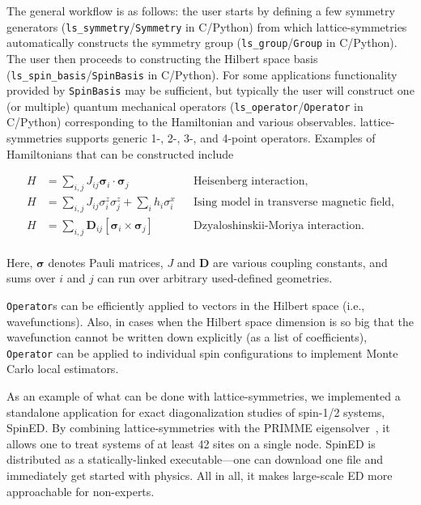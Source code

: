 The general workflow is as follows: the user starts by defining a few symmetry generators (\texttt{ls\_symmetry}/\texttt{Symmetry} in C/Python) from which lattice-symmetries automatically constructs the symmetry group (\texttt{ls\_group}/\texttt{Group} in C/Python). The user then proceeds to constructing the Hilbert space basis (\texttt{ls\_spin\_basis}/\texttt{SpinBasis} in C/Python). For some applications functionality provided by \texttt{SpinBasis} may be sufficient, but typically the user will construct one (or multiple) quantum mechanical operators (\texttt{ls\_operator}/\texttt{Operator} in C/Python) corresponding to the Hamiltonian and various observables. lattice-symmetries supports generic 1-, 2-, 3-, and 4-point operators. Examples of Hamiltonians that can be constructed include

\begin{equation*}
\begin{aligned}
    H &= \sum_{i, j} J_{ij} \boldsymbol\sigma_i \cdot \boldsymbol\sigma_j && \text{Heisenberg interaction,} \\
    H &= \sum_{i, j} J_{ij} \sigma^z_i \sigma^z_j + \sum_i h_i \sigma^x_i && \text{Ising model in transverse magnetic field,} \\
    H &= \sum_{i, j} \mathbf{D}_{ij} \left[ \boldsymbol\sigma_i \times \boldsymbol\sigma_j \right] && \text{Dzyaloshinskii-Moriya interaction.} \\
\end{aligned}
\end{equation*}

Here, $\boldsymbol\sigma$ denotes Pauli matrices, $J$ and $\mathbf{D}$ are various coupling constants, and sums over $i$ and $j$ can run over arbitrary used-defined geometries.

\texttt{Operator}s can be efficiently applied to vectors in the Hilbert space (i.e., wavefunctions). Also, in cases when the Hilbert space dimension is so big that the wavefunction cannot be written down explicitly (as a list of coefficients), \texttt{Operator} can be applied to individual spin configurations to implement Monte Carlo local estimators.

As an example of what can be done with lattice-symmetries, we implemented a standalone application for exact diagonalization studies of spin-1/2 systems, SpinED. By combining lattice-symmetries with the PRIMME eigensolver~\cite{Statho2010Primme}, it allows one to treat systems of at least 42 sites on a single node. SpinED is distributed as a statically-linked executable---one can download one file and immediately get started with physics. All in all, it makes large-scale ED more approachable for non-experts.

